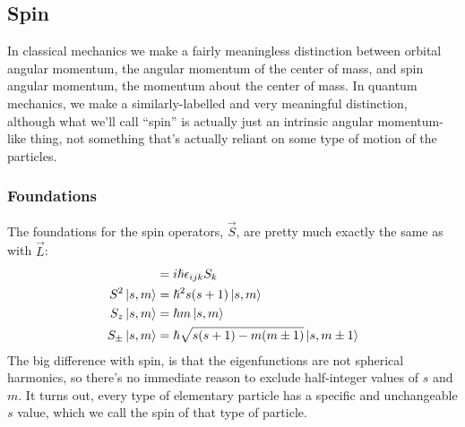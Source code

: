 \documentclass[a4paper]{article}
\begin{document}
\subsection{Spin}
In classical mechanics we make a fairly meaningless distinction between
orbital angular momentum, the angular momentum of the center of mass, and spin
angular momentum, the momentum about the center of mass. In quantum mechanics,
we make a similarly-labelled and very meaningful distinction, although what
we'll call ``spin'' is actually just an intrinsic angular momentum-like thing,
not something that's actually reliant on some type of motion of the particles.

\subsubsection{Foundations}

The foundations for the spin operators, $\vec{S}$, are pretty much exactly the
same as with $\vec{L}$:
\begin{align*}
	[S_i,S_j]&=i\hslash\epsilon_{ijk}S_k\\
	S^2\bket{s,m} &= \hslash^2 s(s+1)\bket{s,m}\\
	S_z\bket{s,m} &= \hslash m\bket{s,m}\\
	S_\pm\bket{s,m}&=\hslash\sqrt{s(s+1)-m(m\pm1)}\bket{s,m\pm1}
\end{align*}
The big difference with spin, is that the eigenfunctions are not spherical
harmonics, so there's no immediate reason to exclude half-integer values
of $s$ and $m$. It turns out, every type of elementary particle has a specific
and unchangeable $s$ value, which we call the spin of that type of particle.
\end{document}

